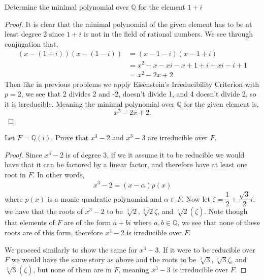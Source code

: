 \documentclass[11pt]{article}
\newenvironment{problem}[2][Problem\!]{\begin{tcolorbox}\begin{trivlist}
\item[\hskip \labelsep {\bfseries #1}\hskip \labelsep {\bfseries #2}]}{\end{trivlist}\end{tcolorbox}}
\newcommand{\qq}{\mathbb Q}   %
\begin{document}
\begin{problem}{13.2.3}
    Determine the minimal polynomial over $\qq$ for the element $1 + i$
\end{problem}
\begin{proof}
    It is clear that the minimal polynomial of the given element has to be at least degree 2 since $1 + i$ is not in the field of rational numbers. We see through conjugation that,
    \begin{align*}
        (x- (1+i))(x - (1 -i)) &= (x-1 - i)(x -1 +i) \\
        &= x^{2} -x -xi -x +1 +i +xi -i + 1\\
        &= x^{2} -2x +2
    \end{align*}
    Then like in previous problems we apply Eisenstein's Irreducibility Criterion with $p =2$, we see that $2$ divides 2 and -2, doesn't divide 1, and 4 doesn't divide 2, so it is irreducible. Meaning the minimal polynomial over $\qq$ for the given element is,
    \[x^{2} -2x + 2.\]
\end{proof}
\newpage
\begin{problem}{13.2.5}
    Let $F = \qq(i)$. Prove that $x^{3} -2$ and $x^{3} -3$ are irreducible over $F$.
\end{problem}
\begin{proof}
    Since $x^{3}-2$ is of degree 3, if we it assume it to be reducible we would have that it can be factored by a linear factor, and therefore have at least one root in $F$. In other words, 
    \begin{align*}
        x^{3}-2 = (x-\alpha)p(x)
    \end{align*}
    where $p(x)$ is a monic quadratic polynomial and $\alpha \in F$. Now let $\zeta = \dfrac{1}{2} + \dfrac{\sqrt3}{2}i$, we have that the roots of $x^{3} - 2$ to be $\sqrt[3]{2}, \sqrt[3]{2}\zeta$, and $\sqrt[3]{2}(\overline{\zeta})$. Note though that elements of $F$ are of the form $a+bi$ where $a,b\in \qq$, we see that none of these roots are of this form, therefore $x^{3}-2$ is irreducible over $F$.

    We proceed similarly to show the same for $x^{3} - 3$. If it were to be reducible over $F$ we would have the same story as above and the roots to be $\sqrt[3]{3}, \sqrt[3]{3}\zeta$, and $\sqrt[3]{3}(\overline{\zeta})$, but none of them are in $F$, meaning $x^{3} - 3$ is irreducible over $F$.
\end{proof}
\end{document}
